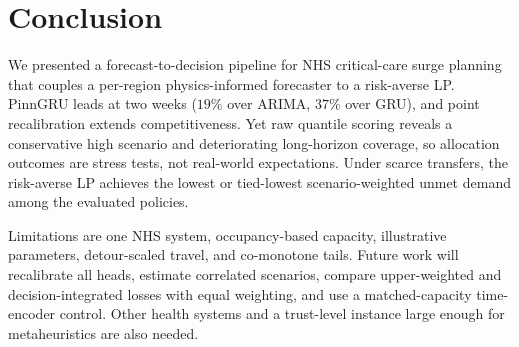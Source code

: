 \section{Conclusion}\label{sec:conclusion}

We presented a forecast-to-decision pipeline for NHS critical-care
surge planning that couples a per-region physics-informed forecaster to
a risk-averse LP. PinnGRU leads at two weeks ($19\%$ over ARIMA, $37\%$
over GRU), and point recalibration extends competitiveness. Yet raw
quantile scoring reveals a conservative high scenario and deteriorating
long-horizon coverage, so allocation outcomes are stress tests, not
real-world expectations. Under scarce transfers, the risk-averse LP
achieves the lowest or tied-lowest scenario-weighted unmet demand among
the evaluated policies.

Limitations are one NHS system, occupancy-based capacity, illustrative
parameters, detour-scaled travel, and co-monotone tails. Future work
will recalibrate all heads, estimate correlated scenarios, compare
upper-weighted and decision-integrated losses with equal weighting, and
use a matched-capacity time-encoder control. Other health systems and a
trust-level instance large enough for metaheuristics are also needed.
